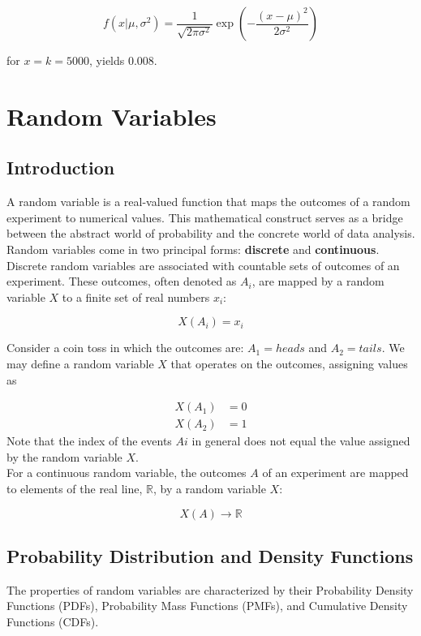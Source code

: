 \documentclass[12pt]{book}
\theoremstyle{definition}
\begin{document}
\[
f(x | \mu, \sigma^2) = \frac{1}{\sqrt{2 \pi \sigma^2}} \exp\left(-\frac{(x - \mu)^2}{2 \sigma^2}\right)
\]

for \(x=k=5000\), yields 0.008. 



\chapter{Random Variables}

\section{Introduction}
A random variable is a real-valued function that maps the outcomes of a random experiment to numerical values. This mathematical construct serves as a bridge between the abstract world of probability and the concrete world of data analysis. Random variables come in two principal forms: \textbf{discrete} and \textbf{continuous}.\\

Discrete random variables are associated with countable sets of outcomes of an experiment. These outcomes, often denoted as \(A_i\), are mapped by a random variable \(X\) to a finite set of real numbers \(x_i\):

\[
X(A_i) = x_i
\]

Consider a coin toss in which the outcomes are: \(A_1 = heads\) and \(A_2 = tails\). We may define a random variable \(X\) that operates on the outcomes, assigning values as 

\[
    \begin{aligned}
         X(A_1) & = 0 \\ 
        X(A_2) & = 1
    \end{aligned}
\]
Note that the index of the events \(Ai\) in general does not equal the value assigned by the random variable \(X\).\\

For a continuous random variable, the outcomes \(A\) of an experiment are mapped to elements of the real line, \(\mathbb{R}\), by a random variable \(X\):

\[
X(A) \rightarrow \mathbb{R}
\]


\section{Probability Distribution and Density Functions}

The properties of random variables are characterized by their Probability Density Functions (PDFs), Probability Mass Functions (PMFs), and Cumulative Density Functions (CDFs).
\end{document}

